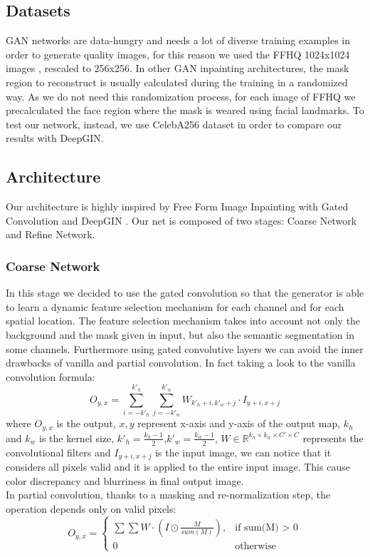 \documentclass[10pt,twocolumn,letterpaper]{article}
\begin{document}
\subsection{Datasets}
GAN networks are data-hungry and needs a lot of diverse training examples in
order to generate quality images, for this reason we used the FFHQ 1024x1024
images \cite{karras2019style}, rescaled to 256x256.  In other GAN inpainting
architectures, the mask region to reconstruct is usually calculated during the
training in a randomized way.  As we do not need this randomization process, for
each image of FFHQ we precalculated the face region where the mask is weared
using facial landmarks. To test our network, instead, we use CelebA256 dataset
in order to compare our results with DeepGIN.

\subsection{Architecture}
Our architecture is highly inspired by Free Form Image Inpainting with Gated
Convolution \cite{yu2019free} and DeepGIN \cite{li2020deepgin}.
Our net is composed of two stages: Coarse Network and Refine Network.
\subsubsection{Coarse Network}
In this stage we decided to use the gated convolution so that the generator is
able to learn a dynamic feature selection mechanism for each channel and for
each spatial location. The feature selection mechanism takes into account not
only the background and the mask given in input, but also the semantic
segmentation in some channels.
Furthermore using gated convolutive layers we can avoid the inner drawbacks of
vanilla and partial convolution. In fact taking a look to the vanilla
convolution formula:
\begin{equation}
    O_{y,x} = \sum_{i=-k'_h}^{k'_h}\sum_{j=-k'_w}^{k'_w} W_{k'_h + i, k'_w + j} \cdot I_{y + i, x + j}
\end{equation}
where \(O_{y,x}\) is the output, \(x,y\) represent x-axis and y-axis of the output map, \(k_h\) and \(k_w\) is the kernel size, \(k'_h = \frac{k_h - 1}{2}\),\(k'_w = \frac{k_w - 1}{2}\), \(W \in \mathbb{R}^{k_h \times k_w \times C' \times C}\) represents the convolutional filters and \(I_{y + i, x + j}\) is the input image, we can notice that it considers all pixels valid and it is applied to the entire input image. This cause color discrepancy and blurriness in final output image.
\\
In partial convolution, thanks to a masking and re-normalization step, the operation depends only on valid pixels:
\begin{equation}
    O_{y,x} = \begin{cases}
    \sum \sum W \cdot (I \odot \frac{M}{sum(M)}), & \text{if sum(M) \(>\) 0} \\ 0 & \text{otherwise}
    \end{cases}
\end{equation}
\end{document}
